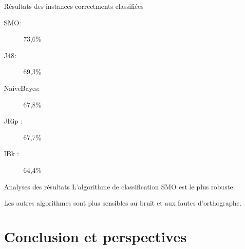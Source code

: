 \documentclass{beamer}
\begin{document}
\begin{frame}
	\begin{block}{Résultats des instances correctments classifiées}
		\begin{description}
			\item[SMO: ]73,6\%
			\item[J48: ]69,3\%
			\item[NaiveBayes: ]67,8\%
			\item[JRip :]67,7\%
			\item[IBk :]64,4\%
		\end{description}	
	\end{block}
\end{frame}

\begin{frame}
	\begin{block}{Analyses des résultats}
		L'algorithme de classification SMO est le plus robuste.
		
		Les autres algorithmes sont plus sensibles au bruit et aux fautes d'orthographe.
	\end{block}
\end{frame}

\section{Conclusion et perspectives}
\begin{frame}

\end{frame}
\end{document}
